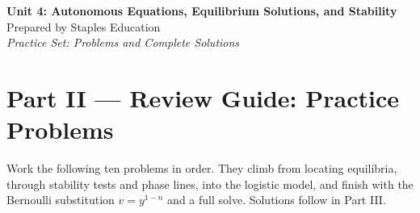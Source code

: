 




\begin{center}
    {\LARGE \bfseries Unit 4: Autonomous Equations, Equilibrium Solutions, and Stability}\\[6pt]
    {\large Prepared by Staples Education}\\[4pt]
    {\itshape Practice Set: Problems and Complete Solutions}
\end{center}

\vspace{0.4em}

{}
\section*{Part II --- Review Guide: Practice Problems}

Work the following ten problems in order. They climb from locating equilibria,
through stability tests and phase lines, into the logistic model, and finish with
the Bernoulli substitution $v = y^{1-n}$ and a full solve. Solutions follow in
Part III.

